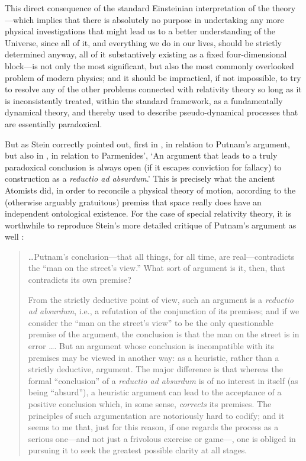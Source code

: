This direct consequence of the standard Einsteinian interpretation of the theory---which implies that there is absolutely no purpose in undertaking any more physical investigations that might lead us to a better understanding of the Universe, since all of it, and everything we do in our lives, should be strictly determined anyway, all of it substantively existing as a fixed four-dimensional block---is not only the most significant, but also the most commonly overlooked problem of modern physics; and it should be impractical, if not impossible, to try to resolve any of the other problems connected with relativity theory so long as it is inconsistently treated, within the standard framework, as a fundamentally dynamical theory, and thereby used to describe pseudo-dynamical processes that are essentially paradoxical.

But as Stein correctly pointed out, first in \cite{Stein1968}, in relation to Putnam's argument, but also in \cite{Stein1969}, in relation to Parmenides', `An argument that leads to a truly paradoxical conclusion is always open (if it escapes conviction for fallacy) to construction as a \textit{reductio ad absurdum}.' This is precisely what the ancient Atomists did, in order to reconcile a physical theory of motion, according to the (otherwise arguably gratuitous) premiss that space really does have an independent ontological existence. For the case of special relativity theory, it is worthwhile to reproduce Stein's more detailed critique of Putnam's argument as well \cite{Stein1968}:
\begin{quotation}
\ldots Putnam's conclusion---that all things, for all time, are real---contradicts the ``man on the street's view.'' What sort of argument is it, then, that contradicts its own premise?

From the strictly deductive point of view, such an argument is a \textit{reductio ad absurdum}, i.e., a refutation of the conjunction of its premises; and if we consider the ``man on the street's view'' to be the only questionable premise of the argument, the conclusion is that the man on the street is in error \ldots. But an argument whose conclusion is incompatible with its premises may be viewed in another way: as a heuristic, rather than a strictly deductive, argument. The major difference is that whereas the formal ``conclusion'' of a \textit{reductio ad absurdum} is of no interest in itself (as being ``absurd''), a heuristic argument can lead to the acceptance of a positive conclusion which, in some sense, \textit{corrects} its premises. The principles of such argumentation are notoriously hard to codify; and it seems to me that, just for this reason, if one regards the process as a serious one---and not just a frivolous exercise or game---, one is obliged in pursuing it to seek the greatest possible clarity at all stages.
\end{quotation}

